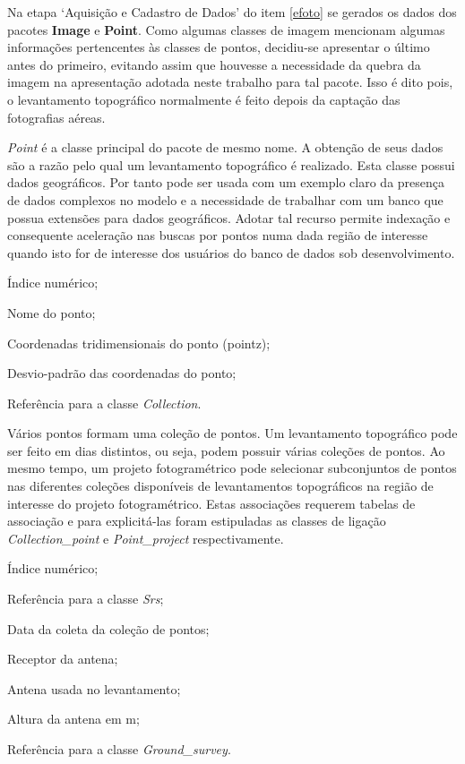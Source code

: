 Na etapa `Aquisição e Cadastro de Dados' do item \ref{efoto} se gerados os dados dos pacotes \textbf{Image} e \textbf{Point}. Como algumas classes de imagem mencionam algumas informações pertencentes às classes de pontos, decidiu-se apresentar o último antes do primeiro, evitando assim que houvesse a necessidade da quebra da imagem na apresentação adotada neste trabalho para tal pacote. Isso é dito pois, o levantamento topográfico normalmente é feito depois da captação das fotografias aéreas.

\textit{Point} é a classe principal do pacote de mesmo nome. A obtenção de seus dados são a razão pelo qual um levantamento topográfico é realizado. Esta classe possui dados geográficos. Por tanto pode ser usada com um exemplo claro da presença de dados complexos no modelo e a necessidade de trabalhar com um banco que possua extensões para dados geográficos. Adotar tal recurso permite indexação e consequente aceleração nas buscas por pontos numa dada região de interesse quando isto for de interesse dos usuários do banco de dados sob desenvolvimento.

\begin{description}[labelwidth=2cm, itemsep=-0.3cm]
\item [Classe Point]
\item[Id:] Índice numérico;
\item[Name:] Nome do ponto;
\item[Geom:] Coordenadas tridimensionais do ponto (pointz);
\item[Sigma:] Desvio-padrão das coordenadas do ponto;
\item[Id\_coll:] Referência para a classe \textit{Collection}.
\end{description}

Vários pontos formam uma coleção de pontos. Um levantamento topográfico pode ser feito em dias distintos, ou seja, podem possuir várias coleções de pontos. Ao mesmo tempo, um projeto fotogramétrico pode selecionar subconjuntos de pontos nas diferentes coleções disponíveis de levantamentos topográficos na região de interesse do projeto fotogramétrico. Estas associações requerem tabelas de associação e para explicitá-las foram estipuladas as classes de ligação \textit{Collection\_point} e \textit{Point\_project} respectivamente.

\begin{description}[labelwidth=2cm, itemsep=-0.3cm]
\item [Classe Collection\_Point]
\item[Id:] Índice numérico;
\item[Id\_srs:] Referência para a classe \textit{Srs};
\item[Date:] Data da coleta da coleção de pontos;
\item[Receptor:] Receptor da antena;
\item[Antenna:] Antena usada no levantamento;
\item[Ant\_lvl:] Altura da antena em m;
\item[Id\_survey:] Referência para a classe \textit{Ground\_survey}.
\end{description}

